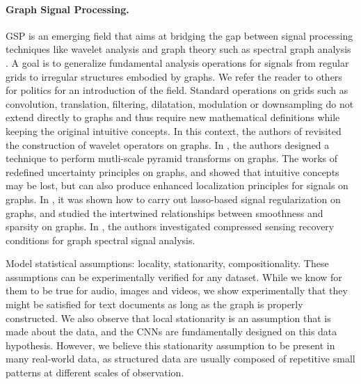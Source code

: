 \documentclass{article}
\newcommand{\todo}[1]{{\color{red} #1 }}
\begin{document}
\paragraph{Graph Signal Processing.} GSP is an emerging field that aims at
bridging the gap between signal processing techniques like wavelet analysis and
graph theory such as spectral graph analysis
\cite{art:BelkinNiyogi05LaplaBeltrami, art:VonLuxburg07Tutorial}. A goal is to
generalize fundamental analysis operations for signals from regular grids to
irregular structures embodied by graphs. We refer the reader to
\cite{art:ShumanNarangFrossardOrtegaVandergheynst13ReviewSPG}
\todo{others for politics} for an
introduction of the field. Standard operations on grids such as convolution,
translation, filtering, dilatation, modulation or downsampling do not extend
directly to graphs and thus require new mathematical definitions while keeping
the original intuitive concepts. In this context, the authors of
\cite{art:HammondVandergheynstGribonval11GraphWav, art:CoifmanLafon06DifMap,
pro:GavishNadlerCoifman10GraphHaar} revisited the construction of wavelet
operators on graphs. In \cite{art:ShumanFarajiVandergheynst16PyramTrans,
art:RamEladCohen11TreeWavelets}, the authors designed a technique to perform
mutli-scale pyramid transforms on graphs. The works of
\cite{pro:TsitsveroBarbarossa15Uncert, pro:PasdeloupAlamiGriponRabbat15Uncert,
art:PerraudinRicaudShumanVandergheynst16Uncert} redefined uncertainty principles
on graphs, and showed that intuitive concepts may be lost, but can also produce
enhanced localization principles for signals on graphs. In
\cite{pro:HammondRaoaroorJacquesVandergheynst10LassoGraWav}, it was shown how to
carry out lasso-based signal regularization on graphs, and studied the
intertwined relationships between smoothness and sparsity on graphs. In
\cite{pro:TremblayPuyGribonvalVandergheynst16CompSpecClus}, the authors
investigated compressed sensing recovery conditions for graph spectral signal
analysis.

\todo{Model statistical assumptions: locality, stationarity, compositionality.}
These assumptions can be experimentally verified for any dataset. While we know
for them to be true for audio, images and videos, we show experimentally that
they might be satisfied for text documents as long as the graph is properly
constructed.
We also observe that
local stationarity is an assumption that is made about the data, and the CNNs
are fundamentally designed on this data hypothesis. However, we believe this
stationarity assumption to be present in many real-world data, as structured
data are usually composed of repetitive small patterns at different scales of
observation.
\end{document}
